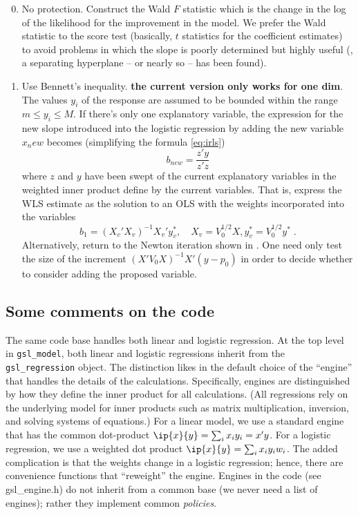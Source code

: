 \documentclass[12pt]{article}
\begin{document}
\begin{enumerate}
\setcounter{enumi}{-1}

\item No protection.  Construct the Wald $F$ statistic which is the
 change in the log of the likelihood for the improvement in the model.
  We prefer the Wald statistic to the score test (basically, $t$
 statistics for the coefficient estimates) to avoid problems in which
 the slope is poorly determined but highly useful (\eg, a separating
 hyperplane -- or nearly so -- has been found).

\item Use Bennett's inequality.  {\bf the current version only works
 for one dim}.  The values $y_i$ of the response are assumed to be
 bounded within the range $m \le y_i \le M$.  If there's only one
 explanatory variable, the expression for the new slope introduced
 into the logistic regression by adding the new variable $x_new$
 becomes (simplifying the formula \ref{eq:irls})
\begin{displaymath}
  b_{new} = \frac{z'y}{z'z}
\end{displaymath}
 where $z$ and $y$ have been swept of the current explanatory variables in the
 weighted inner product define by the current variables.  That is, express the
WLS  estimate as the solution to an OLS with the weights
incorporated into the variables 
\begin{equation}
  b_1 = (X_v'X_v)^{-1}X_v'y^{*}_{v}, 
    \quad X_v = V_0^{1/2}X, y^{*}_v = V_0^{1/2}y^{*} \;.
\label{eq:wls}
\end{equation}
 Alternatively, return to the Newton iteration shown in .  One
 need only test the size of the increment $(X'V_0X)^{-1}X'(y-p_0)$ in order to
 decide whether to consider adding the proposed variable.

\end{enumerate}

\subsection{Some comments on the code}

 The same code base handles both linear and logistic regression.  At the top
 level in {\tt gsl\_model}, both linear and logistic regressions inherit from the
 {\tt gsl\_regression} object.  The distinction likes in the default choice of
 the ``engine'' that handles the details of the calculations.  Specifically,
 engines are distinguished by how they define the inner product for all
 calculations. (All regressions rely on the underlying model for inner products
 such as matrix multiplication, inversion, and solving systems of equations.)
  For a linear model, we use a standard engine that has the common dot-product
 $\ip{x}{y} = \sum_i x_i y_i = x'y$.  For a logistic regression, we use a
 weighted dot product $\ip{x}{y} = \sum_i x_i y_i w_i$.  The added complication
 is that the weights change in a logistic regression; hence, there are
 convenience functions that ``reweight'' the engine.  Engines in the code (see
 gsl\_engine.h) do not inherit from a common base (we never need a list of
 engines); rather they implement common {\em policies}.  
\end{document}
